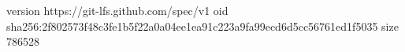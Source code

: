 version https://git-lfs.github.com/spec/v1
oid sha256:2f802573f48c3fe1b5f22a0a04ee1ea91c223a9fa99ecd6d5cc56761ed1f5035
size 786528
